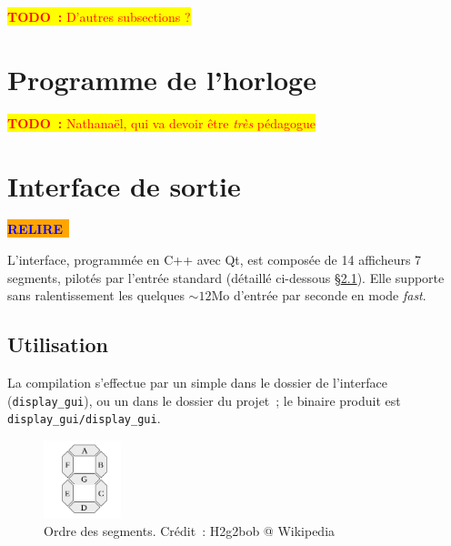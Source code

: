 \documentclass[11pt,a4paper]{article}
\newcommand{\htodo}[1]{\begin{huge}\colorbox{yellow}{\textcolor{red}{\textbf{TODO~:} #1}}\end{huge}}
\newcommand{\relire}{\colorbox{orange}{\textcolor{blue}{\textbf{RELIRE}~}}}
\begin{document}
\vspace{1em}\htodo{D'autres subsections ?}


\section{Programme de l'horloge} \label{sec:clock}

\htodo{Nathanaël, qui va devoir être \emph{très} pédagogue}




\section{Interface de sortie} \label{sec:gui}

\relire

L'interface, programmée en C++ avec Qt, est composée de 14 afficheurs 7 segments, pilotés par l'entrée standard (détaillé ci-dessous §\ref{ssec:gui_use}). Elle supporte sans ralentissement les quelques $\sim 12\text{Mo}$ d'entrée par seconde en mode \emph{fast}.

\subsection{Utilisation} \label{ssec:gui_use}

La compilation s'effectue par un simple  dans le dossier de l'interface (\texttt{display\_gui}), ou un  dans le dossier du projet~; le binaire produit est \texttt{display\_gui/display\_gui}.

\begin{figure}
\begin{center}
\vspace{-1em}
\includegraphics[width=0.2\textwidth]{imgs/7seg-labels.png}
\end{center}
\vspace{-2em}
\caption{Ordre des segments. Crédit~: H2g2bob @ Wikipedia}
\end{figure}
\end{document}
